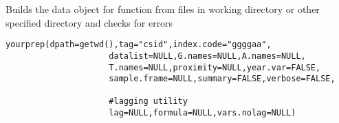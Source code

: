 %
\begin{Description}\relax
Builds the data object for 
function from files in working directory or other specified
directory and checks for errors
\end{Description}
%
\begin{Usage}
\begin{verbatim}
yourprep(dpath=getwd(),tag="csid",index.code="ggggaa",
                     datalist=NULL,G.names=NULL,A.names=NULL,
                     T.names=NULL,proximity=NULL,year.var=FALSE,
                     sample.frame=NULL,summary=FALSE,verbose=FALSE,

                     #lagging utility
                     lag=NULL,formula=NULL,vars.nolag=NULL)
\end{verbatim}
\end{Usage}
%
